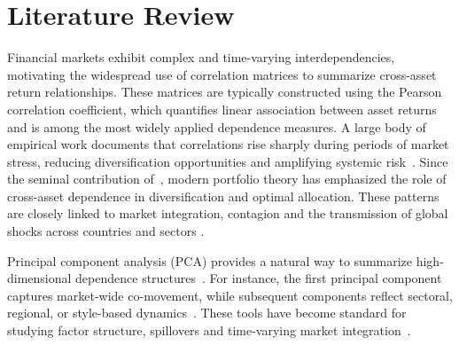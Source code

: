 \documentclass[pdflatex,sn-basic]{sn-jnl}%
\theoremstyle{thmstyleone}%
\theoremstyle{thmstyletwo}%
\theoremstyle{thmstylethree}%
\begin{document}
\section{Literature Review}
\label{sec:review}

Financial markets exhibit complex and time-varying interdependencies, motivating 
the widespread use of correlation matrices to summarize cross-asset return relationships. 
These matrices are typically constructed using the Pearson correlation coefficient, 
which quantifies linear association between asset returns and is among the most 
widely applied dependence measures. %
A large body of empirical work documents that correlations rise sharply during periods 
of market stress, reducing diversification opportunities and amplifying
systemic risk~\citep{longin2001extreme,forbes2002no,ang2002international,billio2012econometric}.
Since the seminal contribution of~\citet{markowitz1952portfolio}, modern portfolio theory 
has emphasized the role of cross-asset dependence in diversification and optimal allocation. 
These patterns are closely linked to market integration, contagion and the
transmission of global shocks across countries and sectors
\citep{bekaert2003market,diebold2012better}. 

Principal component analysis (PCA) provides a natural way to summarize high-dimensional
dependence structures~\citep[see, e.g.,][]{jolliffe2011principal}. For instance, the first principal component 
captures market-wide co-movement,
while subsequent components reflect sectoral, regional, or style-based
dynamics~\citep{king1966market, meyers1973re}. These tools have become standard for studying 
factor structure, spillovers and time-varying market integration~\citep{diebold2012better,molero2025random}.
\end{document}
